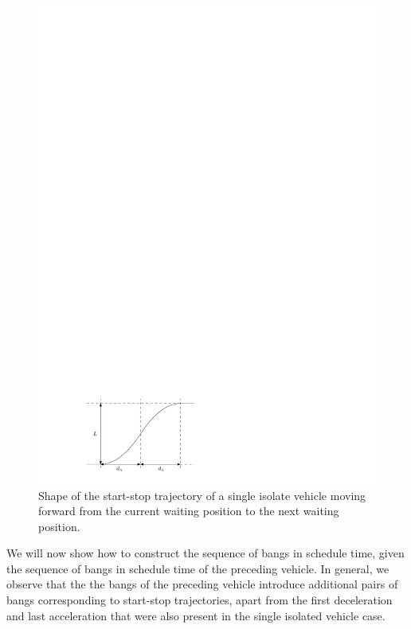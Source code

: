 \documentclass[a4paper]{article}
\theoremstyle{definition}
\theoremstyle{plain}
\begin{document}
\begin{figure}
  \centering
  \includegraphics[scale=1.0]{figures/motion/start_stop_trajectory}
  \caption{Shape of the start-stop trajectory of a single isolate vehicle moving
    forward from the current waiting position to the next waiting position.}
  \label{fig:start-stop}
\end{figure}

We will now show how to construct the sequence of bangs in schedule time, given
the sequence of bangs in schedule time of the preceding vehicle. In general, we
observe that the the bangs of the preceding vehicle introduce additional pairs
of bangs corresponding to start-stop trajectories, apart from the first
deceleration and last acceleration that were also present in the single isolated
vehicle case.
\end{document}
